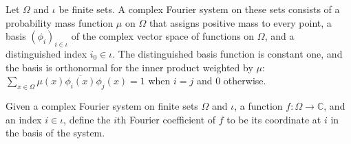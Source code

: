 \begin{definition}
\label{FABL.ComplexFourierSystem}
\leanok
{}
Let $\Omega$ and $\iota$ be finite sets. A complex Fourier system on these sets consists
of a probability mass function $\mu$ on $\Omega$ that assigns positive mass to every
point, a basis $(\phi_i)_{i\in\iota}$ of the complex vector space of functions on
$\Omega$, and a distinguished index $i_0\in\iota$. The distinguished basis function is
constant one, and the basis is orthonormal for the inner product weighted by $\mu$:
$\sum_{x\in\Omega}\mu(x)\overline{\phi_i(x)}\phi_j(x)=1$ when $i=j$ and $0$ otherwise.
\end{definition}

\begin{definition}
\label{FABL.ComplexFourierSystem.coeff}
\leanok
{}
Given a complex Fourier system on finite sets $\Omega$ and $\iota$, a function
$f:\Omega\to\mathbb{C}$, and an index $i\in\iota$, define the $i$th Fourier coefficient
of $f$ to be its coordinate at $i$ in the basis of the system.
\end{definition}

